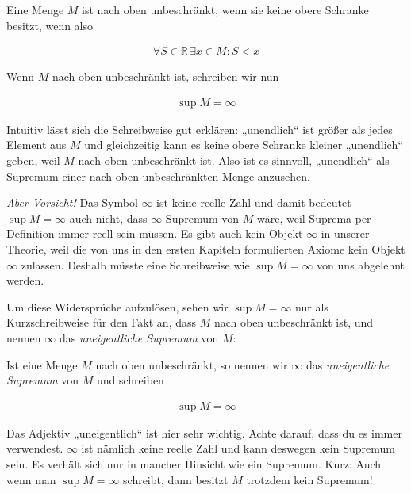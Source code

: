 \documentclass[fontsize=9pt,
               parskip=half-,
               DIV=14,
               listof=chapterentry,
               tocflat]{scrbook}
\begin{document}
\begin{definition*}
Eine Menge $M$ ist nach oben unbeschränkt, wenn sie keine obere Schranke besitzt, wenn also

\begin{align*}
\forall S\in \mathbb {R} \,\exists x\in M:S<x
\end{align*}

\end{definition*}

Wenn $M$ nach oben unbeschränkt ist, schreiben wir nun

\begin{align*}
\sup M=\infty 
\end{align*}

Intuitiv lässt sich die Schreibweise gut erklären: „unendlich“ ist größer als jedes Element aus $M$ und gleichzeitig kann es keine obere Schranke kleiner „unendlich“ geben, weil $M$ nach oben unbeschränkt ist. Also ist es sinnvoll, „unendlich“ als Supremum einer nach oben unbeschränkten Menge anzusehen.

\emph{Aber Vorsicht!} Das Symbol $\infty $ ist keine reelle Zahl und damit bedeutet $\sup M=\infty $ auch nicht, dass $\infty $ Supremum von $M$ wäre, weil Suprema per Definition immer reell sein müssen. Es gibt auch kein Objekt $\infty $ in unserer Theorie, weil die von uns in den ersten Kapiteln formulierten Axiome kein Objekt $\infty $ zulassen. Deshalb müsste eine Schreibweise wie $\sup M=\infty $ von uns abgelehnt werden.

Um diese Widersprüche aufzulösen, sehen wir $\sup M=\infty $ nur als Kurzschreibweise für den Fakt an, dass $M$ nach oben unbeschränkt ist, und nennen $\infty $ das \emph{uneigentliche Supremum} von $M$:

\begin{definition*}
Ist eine Menge $M$ nach oben unbeschränkt, so nennen wir $\infty $ das \emph{uneigentliche Supremum} von $M$ und schreiben

\begin{align*}
\sup M=\infty 
\end{align*}

\end{definition*}

\begin{warning*}
Das Adjektiv „uneigentlich“ ist hier sehr wichtig. Achte darauf, dass du es immer verwendest. $\infty $ ist nämlich keine reelle Zahl und kann deswegen kein Supremum sein. Es verhält sich nur in mancher Hinsicht wie ein Supremum. Kurz: Auch wenn man $\sup M=\infty $ schreibt, dann besitzt $M$ trotzdem kein Supremum!

\end{warning*}
\end{document}
